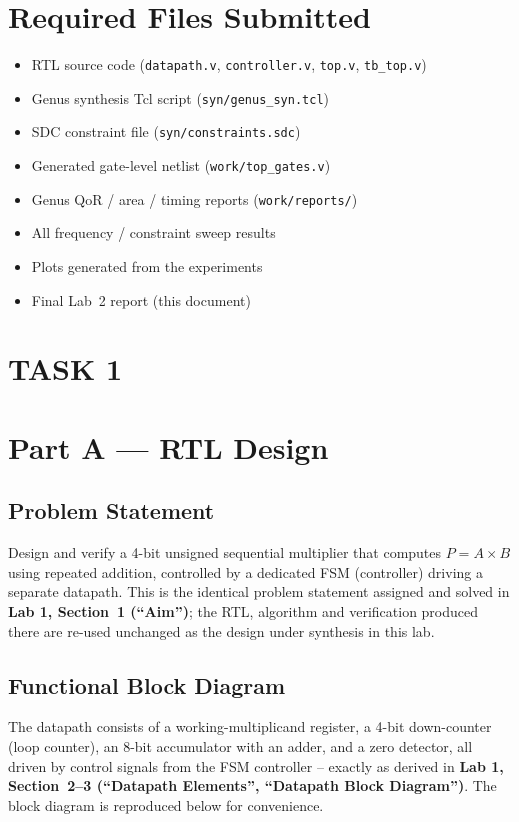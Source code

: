 \documentclass[11pt]{article}
\newcommand{\lab}[1]{\textbf{Lab 1, Section~#1}}
\begin{document}
\section{Required Files Submitted}
\begin{itemize}
    \item RTL source code (\texttt{datapath.v}, \texttt{controller.v}, \texttt{top.v}, \texttt{tb\_top.v})
    \item Genus synthesis Tcl script (\texttt{syn/genus\_syn.tcl})
    \item SDC constraint file (\texttt{syn/constraints.sdc})
    \item Generated gate-level netlist (\texttt{work/top\_gates.v})
    \item Genus QoR / area / timing reports (\texttt{work/reports/})
    \item All frequency / constraint sweep results
    \item Plots generated from the experiments
    \item Final Lab~2 report (this document)
\end{itemize}

\section*{TASK 1}

\section{Part A --- RTL Design}

\subsection{Problem Statement}
Design and verify a 4-bit unsigned sequential multiplier that computes $P = A \times B$ using
repeated addition, controlled by a dedicated FSM (controller) driving a separate datapath. This is
the identical problem statement assigned and solved in \lab{1 (``Aim'')}; the RTL, algorithm and
verification produced there are re-used unchanged as the design under synthesis in this lab.

\subsection{Functional Block Diagram}
The datapath consists of a working-multiplicand register, a 4-bit down-counter (loop counter), an
8-bit accumulator with an adder, and a zero detector, all driven by control signals from the FSM
controller -- exactly as derived in \lab{2--3 (``Datapath Elements'', ``Datapath Block
Diagram'')}. The block diagram is reproduced below for convenience.
\end{document}
